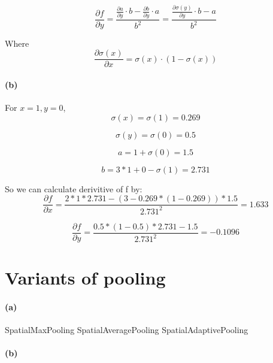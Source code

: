 \documentclass{article}
\begin{document}
\begin{equation}
\frac{\partial f}{\partial y} 
= \frac{\frac{\partial a}{\partial y} \cdot b - \frac{\partial b}{\partial y} \cdot a }{b^2} 
= \frac{\frac{\partial \sigma{(y)}}{\partial y} \cdot b - a}{b^2}
\end{equation}

Where 
\begin{equation}
\frac{\partial \sigma{(x)}}{\partial x} = \sigma{(x)} \cdot {(1-\sigma{(x)})}
\end{equation}

\paragraph{(b)}
For $x = 1, y = 0$,
\begin{equation}
\sigma{(x)} = \sigma{(1)} = 0.269
\end{equation}

\begin{equation}
\sigma{(y)} = \sigma{(0)} = 0.5
\end{equation}

\begin{equation}
a = 1 + \sigma{(0)} = 1.5
\end{equation}

\begin{equation}
b = 3*1 + 0 - \sigma{(1)} = 2.731
\end{equation}

So we can calculate derivitive of f by:
\begin{equation}
\frac{\partial f}{\partial x} = \frac{2*1*2.731-(3-0.269*(1-0.269))*1.5}{2.731^2} = 1.633
\end{equation}

\begin{equation}
\frac{\partial f}{\partial y} = \frac{0.5*(1-0.5)*2.731-1.5}{2.731^2} = -0.1096
\end{equation}

\section{Variants of pooling}

\paragraph{(a)}
SpatialMaxPooling
SpatialAveragePooling
SpatialAdaptivePooling
\paragraph{(b)}
\end{document}
